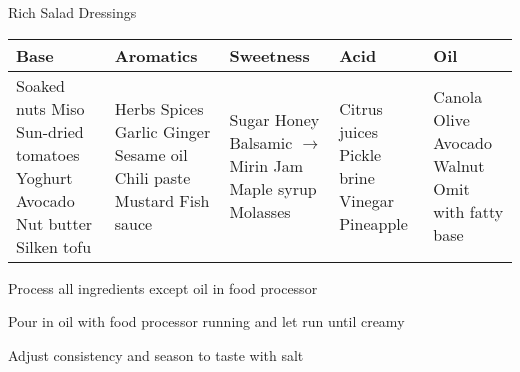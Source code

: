 \begin{densecard}{Rich Salad Dressings}{}
\begin{tabularx}{\textwidth}{@{}XXXXX@{}}
\toprule
Base & Aromatics & Sweetness & Acid & Oil \\
\midrule
Soaked nuts\newline
Miso\newline
Sun-dried tomatoes\newline
Yoghurt\newline
Avocado\newline
Nut butter\newline
Silken tofu
& %
Herbs\newline
Spices\newline
Garlic\newline
Ginger\newline
Sesame oil\newline
Chili paste\newline
Mustard\newline
Fish sauce
& %
Sugar\newline
Honey\newline
Balsamic $\rightarrow$\newline
Mirin\newline
Jam\newline
Maple syrup\newline
Molasses
& %
Citrus juices\newline
Pickle brine\newline
Vinegar\newline
Pineapple
& %
Canola\newline
Olive\newline
Avocado\newline
Walnut\newline
Omit with fatty base
\\
\bottomrule
\end{tabularx}
\begin{steps}
\item Process all ingredients except oil in food processor
\item Pour in oil with food processor running and let run until creamy
\item Adjust consistency and season to taste with salt
\end{steps}
\end{densecard}

